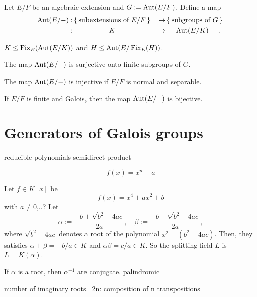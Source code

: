 \documentclass{../../large}
\begin{document}
\begin{prb}
Let $E/F$ be an algebraic extension and $G:=\operatorname{Aut}(E/F)$.
Define a map
\begin{alignat*}{2}
\Aut(E/-)
:&\,\{\,\text{subextensions of $E/F$}\,\}\,&\to&\,\{\,\text{subgroups of $G$}\,\}\,\\
:&\omit\hfil$K$\hfil&\mapsto&\omit\hfil$\Aut(E/K)$\hfil.
\end{alignat*}
\begin{parts}
\item $K\le \operatorname{Fix}_E(\operatorname{Aut}(E/K))$ and $H\le\operatorname{Aut}(E/\operatorname{Fix}_E(H))$.
\item The map $\operatorname{Aut}(E/-)$ is surjective onto finite subgroups of $G$.
\item The map $\operatorname{Aut}(E/-)$ is injective if $E/F$ is normal and separable.
\item If $E/F$ is finite and Galois, then the map $\operatorname{Aut}(E/-)$ is bijective.
\end{parts}
\end{prb}


\section{Generators of Galois groups}


reducible polynomials
semidirect product


\begin{prb}
\[f(x)=x^n-a\]
\end{prb}

\begin{prb}
Let $f\in K[x]$ be
\[f(x)=x^4+ax^2+b\]
with $a\ne0$,..?
Let
\[\alpha:=\frac{-b+\sqrt{b^2-4ac}}{2a},\quad\beta:=\frac{-b-\sqrt{b^2-4ac}}{2a},\]
where $\sqrt{b^2-4ac}$ denotes a root of the polynomial $x^2-(b^2-4ac)$.
Then, they satisfies $\alpha+\beta=-b/a\in K$ and $\alpha\beta=c/a\in K$.
So the splitting field $L$ is $L=K(\alpha)$.
\end{prb}

\begin{prb}
If $\alpha$ is a root, then $\alpha^{\pm1}$ are conjugate.
palindromic
\end{prb}

\begin{prb}
number of imaginary roots=2n: composition of n transpositions
\end{prb}
\end{document}
